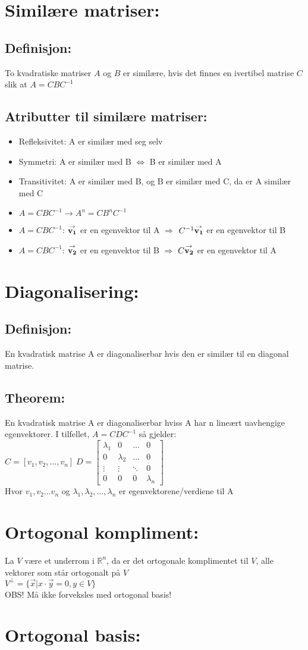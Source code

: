 \documentclass[12pt,a4paper,twocolumn,twoside]{article}
\def\real{\mathbb{R}}
\def\vector#1{\bold{\stackrel{\rightarrow}{#1}}}
\begin{document}
\section*{Similære matriser:}
\subsection*{Definisjon:}
To kvadratiske matriser $A$ og $B$ er similære, hvis det finnes en ivertibel matrise $C$ slik at $A=CBC^{-1}$
\subsection*{Atributter til similære matriser:}
\begin{itemize}[topsep=0pt,itemsep=0pt, partopsep=0pt]
    \item Refleksivitet: A er similær med seg selv
    \item Symmetri: A er similær med B $\Leftrightarrow$ B er similær med A
    \item Transitivitet: A er similær med B, og B er similær med C, da er A similær med C
    \item $A=CBC^{-1}\rightarrow A^n=CB^nC^{-1}$
    \item $A=CBC^{-1}$: $\vector{v_1}$ er en egenvektor til A $\Rightarrow$ $C^{-1}\vector{v_1}$ er en egenvektor til B
    \item $A=CBC^{-1}$: $\vector{v_2}$ er en egenvektor til B $\Rightarrow$ $C\vector{v_2}$ er en egenvektor til A
\end{itemize}

\section*{Diagonalisering:}
\subsection*{Definisjon:}
En kvadratisk matrise A er diagonaliserbar hvis den er similær til en diagonal matrise.
\subsection*{Theorem:}
En kvadratisk matrise A er diagonaliserbar hviss A har n lineært uavhengige egenvektorer.
I tilfellet, $A=CDC^{-1}$ så gjelder:\\
$C=[v_1,v_2,\dots,v_n] \; D=\begin{bmatrix}
    \lambda_1 & 0 & \dots & 0\\
    0 & \lambda_2 & \dots & 0\\
    \vdots & \vdots & \ddots & 0\\
    0 & 0 & 0 & \lambda_n
\end{bmatrix}$\\
Hvor $v_1,v_2\dots v_n$ og $\lambda_1,\lambda_2, \dots,\lambda_n$ er egenvektorene/verdiene til A

\section*{Ortogonal kompliment:}
La $V$ være et underrom i $\real^n$, da er det ortogonale komplimentet til $V$, alle vektorer som står ortogonalt på $V$\\
$V^\perp=\{\vec{x}|x\cdot\vec{y} = 0, y\in V\}$\\
OBS! Må ikke forveksles med ortogonal basis!
\section*{Ortogonal basis:}
\end{document}
